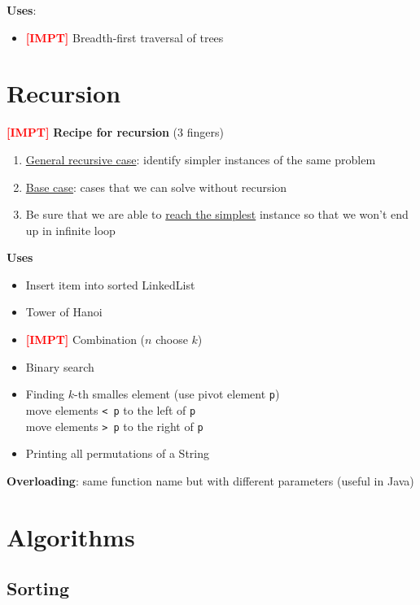\documentclass{article}
\newcommand{\impt}[0]{\textcolor{red}{\textbf{[IMPT] }}}
\begin{document}
\begin{multicols}{2}
\textbf{Uses}:
\begin{itemize}
	\item \impt Breadth-first traversal of trees
\end{itemize}
\section{Recursion}
\impt \textbf{Recipe for recursion} (3 fingers)
\begin{enumerate}
	\item \underline{General recursive case}: identify simpler instances of the same problem
	\item \underline{Base case}: cases that we can solve without recursion
	\item Be sure that we are able to \underline{reach the simplest} instance so that we won't end up in infinite loop
\end{enumerate}
\textbf{Uses}
\begin{itemize}
	\item Insert item into sorted LinkedList
	\item Tower of Hanoi
	\item \impt Combination ($n$ choose $k$)
	\item Binary search
	\item Finding $k$-th smalles element (use pivot element \texttt{p})\\
	move elements \texttt{< p} to the left of \texttt{p}\\
	move elements \texttt{> p} to the right of \texttt{p}
	\item Printing all permutations of a String
\end{itemize}
\textbf{Overloading}: same function name but with different parameters (useful in Java)
\section{Algorithms}
\subsection{Sorting}



\end{multicols}
\end{document}
